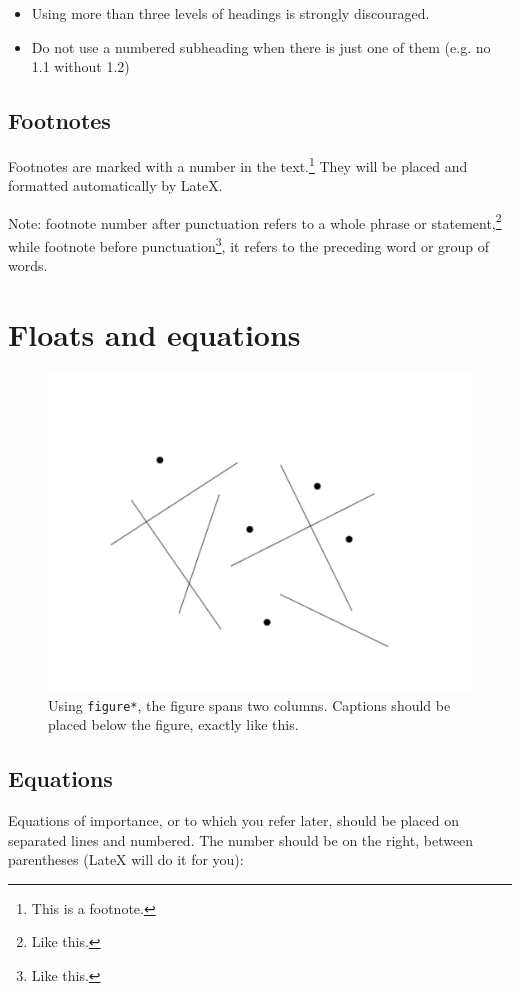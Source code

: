 \documentclass{article}
\begin{document}
\begin{itemize}\itemsep0pt
\item Using more than three levels of headings is strongly discouraged.
\item Do not use a numbered subheading when there is just one of them (e.g. no 1.1 without 1.2) 
\end{itemize}

\subsection{Footnotes}
Footnotes are marked with a number in the text.\footnote{This is a footnote.} 
They will be placed and formatted automatically by LateX.

Note: footnote number after punctuation refers to a whole phrase or statement,\footnote{Like this.} while footnote before punctuation\footnote{Like this.}, it refers to the preceding word or group of words.

\section{Floats and equations}

\begin{figure}[ht!]
\centering
\includegraphics[width=1.5\columnwidth]{figure}
\caption{Using \texttt{figure*}, the figure spans two columns. Captions should be placed below the figure, exactly like this.
\label{fig:example}}
\end{figure}

\subsection{Equations}
Equations of importance, or to which you refer later,
should be placed on separated lines and numbered.
The number should be on the right, between parentheses (LateX will do it for you):
\end{document}

